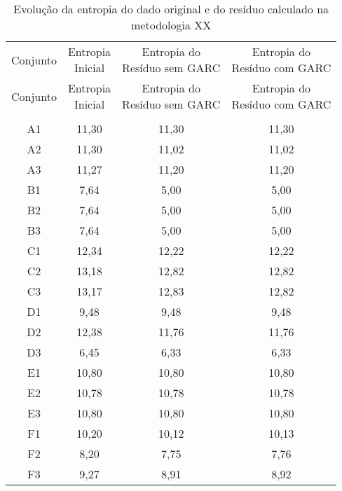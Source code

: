 \begin{center}
\begin{longtable}{cccc}
\toprule
\rowcolor{white}
\caption[Metodologia XX: evolução da entropia]{Evolução da entropia do dado
original e do resíduo calculado na metodologia XX}
\label{tab:EvolucaoEntropiaMet20}\\
\midrule
Conjunto & \specialcell{Entropia \\Inicial} & \specialcell{Entropia do
\\Resíduo sem GARC} & \specialcell{Entropia do
\\Resíduo com GARC}  \\
\midrule
\endfirsthead
\midrule
\rowcolor{white}
Conjunto & \specialcell{Entropia \\Inicial} & \specialcell{Entropia do
\\Resíduo sem GARC} & \specialcell{Entropia do
\\Resíduo com GARC}  \\
\toprule
\endhead
\midrule \\ %
\endfoot
\bottomrule 
\endlastfoot
A1    & 11,30 & 11,30 & 11,30 \\
A2    & 11,30 & 11,02 & 11,02 \\
A3    & 11,27 & 11,20 & 11,20 \\
B1    & 7,64  & 5,00  & 5,00 \\
B2    & 7,64  & 5,00  & 5,00 \\
B3    & 7,64  & 5,00  & 5,00 \\
C1    & 12,34 & 12,22 & 12,22 \\
C2    & 13,18 & 12,82 & 12,82 \\
C3    & 13,17 & 12,83 & 12,82 \\
D1    & 9,48  & 9,48  & 9,48 \\
D2    & 12,38 & 11,76 & 11,76 \\
D3    & 6,45  & 6,33  & 6,33 \\
E1    & 10,80 & 10,80 & 10,80 \\
E2    & 10,78 & 10,78 & 10,78 \\
E3    & 10,80 & 10,80 & 10,80 \\
F1    & 10,20 & 10,12 & 10,13 \\
F2    & 8,20  & 7,75  & 7,76 \\
F3    & 9,27  & 8,91  & 8,92 \\

\end{longtable}
\end{center}

